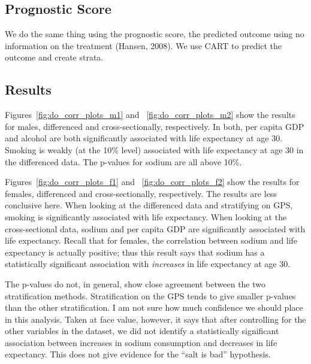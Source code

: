 \documentclass[11pt]{article}\usepackage[]{graphicx}\usepackage[]{color}
\begin{document}
\subsection{Prognostic Score}
We do the same thing using the prognostic score, the predicted outcome using no information on the treatment (Hansen, 2008).
We use CART to predict the outcome and create strata.

\subsection{Results}
Figures~\ref{fig:do_corr_plots_m1} and ~\ref{fig:do_corr_plots_m2} show the results for males, differenced and cross-sectionally, respectively.
In both, per capita GDP and alcohol are both significantly associated with life expectancy at age 30.
Smoking is weakly (at the 10\% level) associated with life expectancy at age 30 in the differenced data.
The p-values for sodium are all above 10\%.

Figures~\ref{fig:do_corr_plots_f1} and ~\ref{fig:do_corr_plots_f2} show the results for females, differenced and cross-sectionally, respectively.
The results are less conclusive here.
When looking at the differenced data and stratifying on GPS, smoking is significantly associated with life expectancy.
When looking at the cross-sectional data, sodium and per capita GDP are significantly associated with life expectancy.
Recall that for females, the correlation between sodium and life expectancy is actually positive; thus this result says that sodium has a statistically significant association with \textit{increases} in life expectancy at age 30.

The p-values do not, in general, show close agreement between the two stratification methods.
Stratification on the GPS tends to give smaller p-values than the other stratification.
I am not sure how much confidence we should place in this analysis.
Taken at face value, however, it says that after controlling for the other variables in the dataset, we did not identify a statistically significant association between increases in sodium consumption and decreases in life expectancy.
This does not give evidence for the ``salt is bad'' hypothesis.
\clearpage
\end{document}
